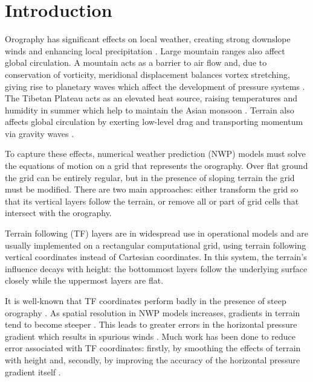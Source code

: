 \chapter{Introduction}

Orography has significant effects on local weather, creating strong downslope winds and enhancing local precipitation \autocite{barry2008}.
Large mountain ranges also affect global circulation.  A mountain acts as a barrier to air flow and, due to conservation of vorticity, meridional displacement balances vortex stretching, giving rise to planetary waves which affect the development of pressure systems \autocite{barry2008}.
The Tibetan Plateau acts as an elevated heat source, raising temperatures and humidity in summer which help to maintain the Asian monsoon \parencites{ye1981}{luo-yanai1983}.
Terrain also affects global circulation by exerting low-level drag \autocite{lott-miller1997} and transporting momentum via gravity waves \autocite{mcfarlane1987}.

To capture these effects, numerical weather prediction (NWP) models must solve the equations of motion on a grid that represents the orography.
Over flat ground the grid can be entirely regular, but in the presence of sloping terrain the grid must be modified.  There are two main approaches: either transform the grid so that its vertical layers follow the terrain, or remove all or part of grid cells that intersect with the orography.

Terrain following (TF) layers are in widespread use in operational models and are usually implemented on a rectangular computational grid, using terrain following vertical coordinates instead of Cartesian coordinates.  In this system, the terrain's influence decays with height: the bottommost layers follow the underlying surface closely while the uppermost layers are flat.

It is well-known that TF coordinates perform badly in the presence of steep orography \autocite{gary1973}.  As spatial resolution in NWP models increases, gradients in terrain tend to become steeper \autocite{steppeler2002}.  This leads to greater errors in the horizontal pressure gradient which results in spurious winds \autocite{dempsey-davis1998}.  Much work has been done to reduce error associated with TF coordinates: firstly, by smoothing the effects of terrain with height \parencites{simmons-burridge1981}{schaer2002}{leuenberger2010}{klemp2011} and, secondly, by improving the accuracy of the horizontal pressure gradient itself \parencites{mahrer1984}{klemp2011}{zaengl2012}.

